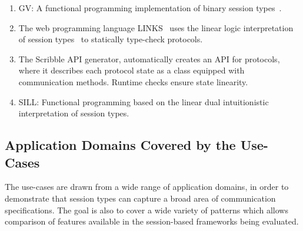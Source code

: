 \begin{enumerate}
	\item	GV:	A functional programming implementation of binary session types~\cite{DBLP:journals/jfp/Wadler14}.

	\item	The web programming language LINKS~\cite{citation_needed}
			uses the linear logic interpretation of session types~\cite{DBLP:journals/jfp/Wadler14}
			to statically type-check protocols.

	\item	The Scribble API generator, automatically creates an API for protocols,
			where it describes each protocol state as a class equipped with
			communication methods. Runtime checks ensure state linearity.

	\item	SILL:		Functional programming based on the linear dual intuitionistic interpretation of session types. 


\end{enumerate}

\subsection{Application Domains Covered by the Use-Cases}

The use-cases are drawn from a wide range of
application domains, in order to demonstrate that
session types can capture
a broad area of communication specifications.
The goal is also to cover a wide variety of patterns which allows comparison of features available in the session-based frameworks being evaluated. 


\newcommand{\myparagraph}[1]{\paragraph{\noindent\textit{\bf #1\ }}}

